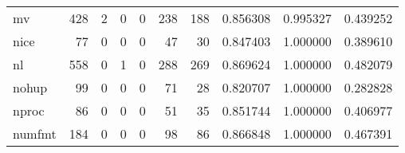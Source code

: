 \begin{tabular}{lrrrrrrrrr}
mv        &                                   428 &                                                  2 &                                                  0 &                                                  0 &                                                238 &                                                188 &                                           0.856308 &                               0.995327 &                             0.439252 \\
nice      &                                    77 &                                                  0 &                                                  0 &                                                  0 &                                                 47 &                                                 30 &                                           0.847403 &                               1.000000 &                             0.389610 \\
nl        &                                   558 &                                                  0 &                                                  1 &                                                  0 &                                                288 &                                                269 &                                           0.869624 &                               1.000000 &                             0.482079 \\
nohup     &                                    99 &                                                  0 &                                                  0 &                                                  0 &                                                 71 &                                                 28 &                                           0.820707 &                               1.000000 &                             0.282828 \\
nproc     &                                    86 &                                                  0 &                                                  0 &                                                  0 &                                                 51 &                                                 35 &                                           0.851744 &                               1.000000 &                             0.406977 \\
numfmt    &                                   184 &                                                  0 &                                                  0 &                                                  0 &                                                 98 &                                                 86 &                                           0.866848 &                               1.000000 &                             0.467391 \\

\end{tabular}
